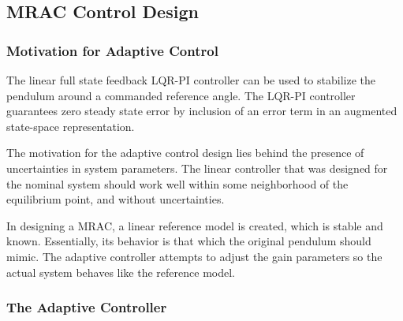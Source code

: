\subsection{MRAC Control Design}

\subsubsection{Motivation for Adaptive Control}

The linear full state feedback LQR-PI controller can be used to stabilize the pendulum around a commanded reference angle.
The LQR-PI controller guarantees zero steady state error by inclusion of an error term in an augmented state-space representation.

The motivation for the adaptive control design lies behind the presence of uncertainties in system parameters.
The linear controller that was designed for the nominal system should work well within some neighborhood of the equilibrium point, and without uncertainties.

In designing a MRAC, a linear reference model is created, which is stable and known.
Essentially, its behavior is that which the original pendulum should mimic.
The adaptive controller attempts to adjust the gain parameters so the actual system behaves like the reference model.

\subsubsection{The Adaptive Controller}

